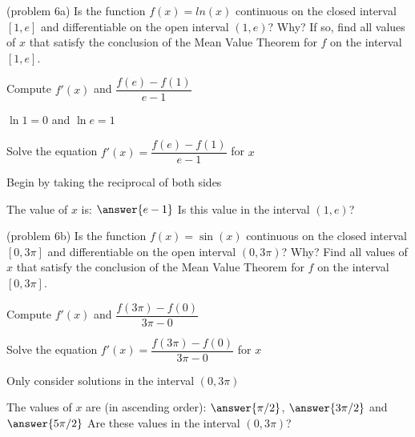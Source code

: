 \documentclass[handout]{ximera}
\begin{document}
\begin{problem}(problem 6a) 
  Is the function $f(x) = ln(x)$ continuous on the closed interval $[1,e]$ and differentiable on the open interval $(1,e)$? Why?
  If so, find all values of $x$ that satisfy the conclusion of the Mean Value Theorem for $f$ on the interval $[1,e]$.
	
    \begin{hint}
      Compute $f'(x)$ and $\dfrac{f(e) - f(1)}{e-1}$
    \end{hint}
    \begin{hint}
    $\ln 1 = 0$ and $\ln e = 1$
    \end{hint}
		\begin{hint}
		  Solve the equation $f'(x) = \dfrac{f(e) - f(1)}{e-1}$ for $x$
		\end{hint}
    \begin{hint}
    Begin by taking the reciprocal of both sides
    \end{hint}
		
		The value of $x$ is:
		 $\answer{e-1}$
     Is this value in the interval $(1,e)$?
\end{problem}


\begin{problem}(problem 6b)
  Is the function $f(x) = \sin(x)$ continuous on the closed interval $[0, 3\pi]$ and differentiable on the open interval $(0, 3\pi)$? Why?
  Find all values of $x$ that satisfy the conclusion of the Mean Value Theorem for $f$ on the interval $[0, 3\pi]$.
	
    \begin{hint}
      Compute $f'(x)$ and $\dfrac{f(3\pi) - f(0)}{3\pi - 0}$
    \end{hint}
		\begin{hint}
		  Solve the equation $f'(x) = \dfrac{f(3\pi) - f(0)}{3\pi - 0}$ for $x$
		\end{hint}
    \begin{hint}
    Only consider solutions in the interval $(0, 3\pi)$
    \end{hint}
		
		The values of $x$ are (in ascending order):
		 $\answer{\pi /2}$, $\answer{3\pi /2}$ and $\answer{5\pi /2}$
     Are these values in the interval $(0, 3\pi)$?
\end{problem}
\end{document}
